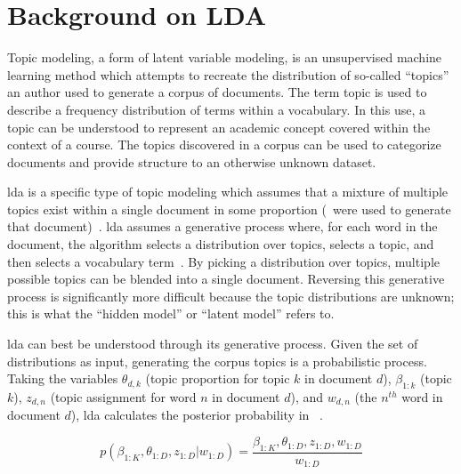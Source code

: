 \section{Background on LDA}
\label{sec:background}


Topic modeling, a form of latent variable modeling, is an unsupervised machine learning method which attempts to recreate the distribution of so-called ``topics'' an author used to generate a corpus of documents.
The term topic is used to describe a frequency distribution of terms within a vocabulary.
In this use, a topic can be understood to represent an academic concept covered within the context of a course.
The topics discovered in a corpus can be used to categorize documents and provide structure to an otherwise unknown dataset.


\acf{lda} is a specific type of topic modeling which assumes that a mixture of multiple topics exist within a single document in some proportion (\ie\ were used to generate that document)~\cite{Blei2003}.
\ac{lda} assumes a generative process where, for each word in the document, the algorithm selects a distribution over topics, selects a topic, and then selects a vocabulary term~\cite{Blei2003}.
By picking a distribution over topics, multiple possible topics can be blended into a single document.
Reversing this generative process is significantly more difficult because the topic distributions are unknown; this is what the ``hidden model'' or ``latent model'' refers to.


\ac{lda} can best be understood through its generative process.
Given the set of distributions as input, generating the corpus topics is a probabilistic process.
Taking the variables $\theta_{d,k}$ (topic proportion for topic $k$ in document $d$), $\beta_{1:k}$ (topic $k$), $z_{d,n}$ (topic assignment for word $n$ in document $d$), and $w_{d,n}$ (the $n^{th}$ word in document $d$), \ac{lda} calculates the posterior probability in ~\cite{Blei2012}.


\begin{equation}
p(\beta_{1:K}, \theta_{1:D},z_{1:D} | w_{1:D}) = \frac{\beta_{1:K},
\theta_{1:D},z_{1:D}, w_{1:D}}{w_{1:D}}
\label{eq:posterior}
\end{equation}

